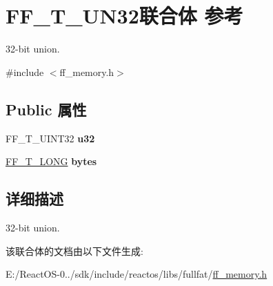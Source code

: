 \hypertarget{union_f_f___t___u_n32}{}\section{F\+F\+\_\+\+T\+\_\+\+U\+N32联合体 参考}
\label{union_f_f___t___u_n32}


32-\/bit union.  




{\ttfamily \#include $<$ff\+\_\+memory.\+h$>$}

\subsection*{Public 属性}
\begin{DoxyCompactItemize}
\item 
\mbox{\label{union_f_f___t___u_n32_ace715b6b24b4caf409933d661d6bf23c}} 
F\+F\+\_\+\+T\+\_\+\+U\+I\+N\+T32 {\bfseries u32}
\item 
\mbox{\label{union_f_f___t___u_n32_a843e37e21388e49bfa8a92cceba17b4e}} 
\hyperlink{struct_f_f___t___l_o_n_g}{F\+F\+\_\+\+T\+\_\+\+L\+O\+NG} {\bfseries bytes}
\end{DoxyCompactItemize}


\subsection{详细描述}
32-\/bit union. 

该联合体的文档由以下文件生成\+:\begin{DoxyCompactItemize}
\item 
E\+:/\+React\+O\+S-\/0../sdk/include/reactos/libs/fullfat/\hyperlink{ff__memory_8h}{ff\+\_\+memory.\+h}\end{DoxyCompactItemize}
